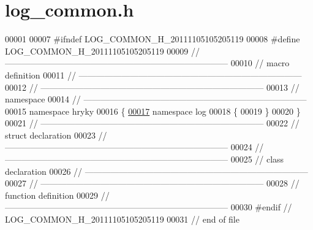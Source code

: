 \hypertarget{log__common_8h_source}{\section{log\-\_\-common.\-h}
}

\begin{DoxyCode}
00001 
00007 \textcolor{preprocessor}{#ifndef LOG\_COMMON\_H\_20111105105205119}
00008 \textcolor{preprocessor}{}\textcolor{preprocessor}{#define LOG\_COMMON\_H\_20111105105205119}
00009 \textcolor{preprocessor}{}\textcolor{comment}{//
      ------------------------------------------------------------------------------}
00010 \textcolor{comment}{// macro definition}
00011 \textcolor{comment}{//
      ------------------------------------------------------------------------------}
00012 \textcolor{comment}{//
      ------------------------------------------------------------------------------}
00013 \textcolor{comment}{// namespace}
00014 \textcolor{comment}{//
      ------------------------------------------------------------------------------}
00015 \textcolor{keyword}{namespace }hryky
00016 \{
\hypertarget{log__common_8h_source_l00017}{}\hyperlink{namespacehryky_1_1log}{00017} \textcolor{keyword}{namespace }log
00018 \{
00019 \}
00020 \}
00021 \textcolor{comment}{//
      ------------------------------------------------------------------------------}
00022 \textcolor{comment}{// struct declaration}
00023 \textcolor{comment}{//
      ------------------------------------------------------------------------------}
00024 \textcolor{comment}{//
      ------------------------------------------------------------------------------}
00025 \textcolor{comment}{// class declaration}
00026 \textcolor{comment}{//
      ------------------------------------------------------------------------------}
00027 \textcolor{comment}{//
      ------------------------------------------------------------------------------}
00028 \textcolor{comment}{// function definition}
00029 \textcolor{comment}{//
      ------------------------------------------------------------------------------}
00030 \textcolor{preprocessor}{#endif // LOG\_COMMON\_H\_20111105105205119}
00031 \textcolor{preprocessor}{}\textcolor{comment}{// end of file}
\end{DoxyCode}
